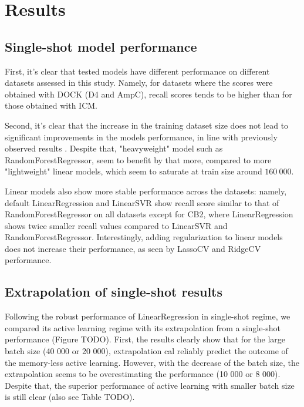 \section{Results}

\subsection{Single-shot model performance}
\label{subsection:single-shot}


First, it's clear that tested models have different performance on different datasets assessed in this study. Namely, for datasets where the scores were obtained with DOCK (D4 and AmpC), recall scores tends to be higher than for those obtained with ICM.

Second, it's clear that the increase in the training dataset size does not lead to significant improvements in the models performance, in line with previously observed results \cite{Yang2021_shoichet_active_learning}. Despite that, "heavyweight" model such as RandomForestRegressor, seem to benefit by that more, compared to more "lightweight" linear models, which seem to saturate at train size around $160\ 000$.

Linear models also show more stable performance across the datasets: namely, default LinearRegression and LinearSVR show recall score similar to that of RandomForestRegressor on all datasets except for CB2, where LinearRegression shows twice smaller recall values compared to LinearSVR and RandomForestRegressor. Interestingly, adding regularization to linear models does not increase their performance, as seen by LassoCV and RidgeCV performance.

\subsection{Extrapolation of single-shot results}
Following the robust performance of LinearRegression in single-shot regime, we compared its active learning regime with its extrapolation from a single-shot performance (Figure TODO). First, the results clearly show that for the large batch size (40 000 or 20 000), extrapolation cal reliably predict the outcome of the memory-less active learning. However, with the decrease of the batch size, the extrapolation seems to be overestimating the performance (10 000 or 8 000). Despite that, the superior performance of active learning with smaller batch size is still clear (also see Table TODO). 

